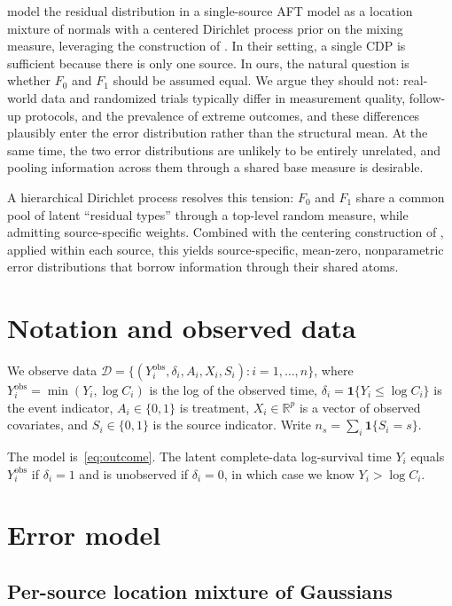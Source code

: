 \documentclass[11pt]{article}
\newcommand{\1}{\mathbf{1}}
\newcommand{\R}{\mathbb{R}}
\begin{document}
\citet{henderson2020individualized} model the residual distribution in a single-source AFT model as a location mixture of normals with a centered Dirichlet process prior on the mixing measure, leveraging the construction of \citet{yang2010semiparametric}. In their setting, a single CDP is sufficient because there is only one source. In ours, the natural question is whether $F_0$ and $F_1$ should be assumed equal. We argue they should not: real-world data and randomized trials typically differ in measurement quality, follow-up protocols, and the prevalence of extreme outcomes, and these differences plausibly enter the error distribution rather than the structural mean. At the same time, the two error distributions are unlikely to be entirely unrelated, and pooling information across them through a shared base measure is desirable.

A hierarchical Dirichlet process \citep{teh2006hierarchical} resolves this tension: $F_0$ and $F_1$ share a common pool of latent ``residual types'' through a top-level random measure, while admitting source-specific weights. Combined with the centering construction of \citet{yang2010semiparametric}, applied within each source, this yields source-specific, mean-zero, nonparametric error distributions that borrow information through their shared atoms.

\section{Notation and observed data}

We observe data $\mathcal{D} = \{(Y_i^{\mathrm{obs}}, \delta_i, A_i, X_i, S_i) : i = 1, \ldots, n\}$, where $Y_i^{\mathrm{obs}} = \min(Y_i, \log C_i)$ is the log of the observed time, $\delta_i = \1\{Y_i \le \log C_i\}$ is the event indicator, $A_i \in \{0, 1\}$ is treatment, $X_i \in \R^p$ is a vector of observed covariates, and $S_i \in \{0, 1\}$ is the source indicator. Write $n_s = \sum_i \1\{S_i = s\}$.

The model is~\eqref{eq:outcome}. The latent complete-data log-survival time $Y_i$ equals $Y_i^{\mathrm{obs}}$ if $\delta_i = 1$ and is unobserved if $\delta_i = 0$, in which case we know $Y_i > \log C_i$.

\section{Error model}

\subsection{Per-source location mixture of Gaussians}
\end{document}
